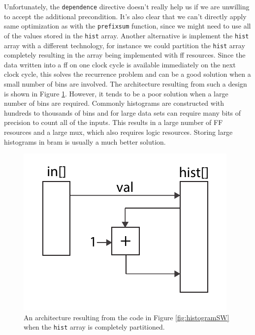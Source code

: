 Unfortunately, the \lstinline{dependence} directive doesn't really help us if we are unwilling to accept the additional precondition.  It's also clear that we can't directly apply same optimization as with the \lstinline|prefixsum| function, since we might need to use all of the values stored in the \lstinline|hist| array.  Another alternative is implement the \lstinline|hist| array with a different technology, for instance we could partition the \lstinline|hist| array completely resulting in the array being implemented with \gls{ff} resources.  Since the data written into a \gls{ff} on one clock cycle is available immediately on the next clock cycle, this solves the recurrence problem and can be a good solution when a small number of bins are involved.  The architecture resulting from such a design is shown in Figure \ref{fig:histogram_partitioned}.  However, it tends to be a poor solution when a large number of bins are required.  Commonly histograms are constructed with hundreds to thousands of bins and for large data sets can require many bits of precision to count all of the inputs.   This results in a large number of FF resources and a large mux, which also requires logic resources.  Storing large histograms in \gls{bram} is usually a much better solution.

\begin{figure}
\centering
{}
\includegraphics[width=  .5\textwidth]{images/architectures_histogram}
\caption{ An architecture resulting from the code in Figure \ref{fig:histogramSW} when the \lstinline|hist| array is completely partitioned.}
\label{fig:histogram_partitioned}
\end{figure}

